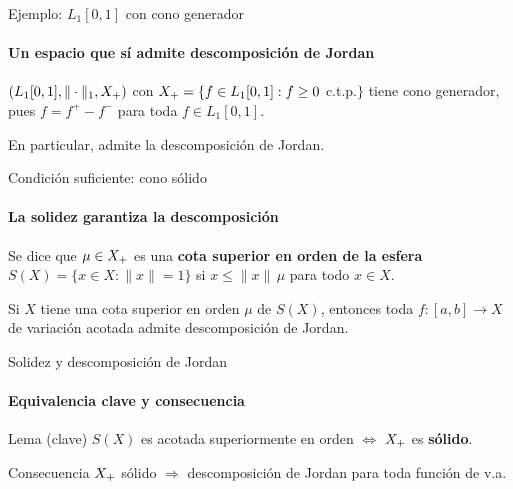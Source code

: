 
\begin{frame}{Ejemplo: $L_1[0,1]$ con cono generador}
\framesubtitle{Un espacio que sí admite descomposición de Jordan}

\begin{block}{}
$(L_1[0,1],\|\cdot\|_1,X_{+})$ con $X_{+}=\{f\in L_1[0,1]:f\ge 0$ c.t.p.$\}$
tiene cono generador, pues $f = f^{+} - f^{-}$ para toda $f\in L_1[0,1]$.

\smallskip
En particular, admite la descomposición de Jordan.
\cite{Gou2004}
\end{block}

\end{frame}


\begin{frame}{Condición suficiente: cono sólido}
\framesubtitle{La solidez garantiza la descomposición}

\begin{definition}
Se dice que $\mu\in X_{+}$ es una \textbf{cota superior en orden de la esfera}
$S(X)=\{x\in X:\|x\|=1\}$ si $x\le\|x\|\,\mu$ para todo $x\in X$.
\end{definition}

\medskip

\begin{theorem}
Si $X$ tiene una cota superior en orden $\mu$ de $S(X)$, entonces
toda $f:[a,b]\to X$ de variación acotada admite descomposición de Jordan.
\end{theorem}

\end{frame}


\begin{frame}{Solidez y descomposición de Jordan}
\framesubtitle{Equivalencia clave y consecuencia}

\begin{block}{Lema (clave)}
$S(X)$ es acotada superiormente en orden $\iff$ $X_{+}$ es \textbf{sólido}.
\end{block}

\medskip

\begin{alertblock}{Consecuencia}
$X_{+}$ sólido $\Longrightarrow$ descomposición de Jordan para toda función de v.a.
\end{alertblock}

\end{frame}

